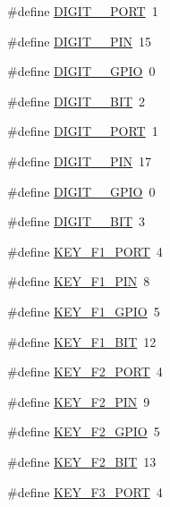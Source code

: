 \begin{DoxyCompactItemize}
\item 
\#define \hyperlink{group__hal_ga94523606bb277125408e8d824039941d}{D\+I\+G\+I\+T\+\_\+\_\+\+P\+O\+RT}~1
\item 
\#define \hyperlink{group__hal_gadd43f59c719841c9b909b1ac0d560306}{D\+I\+G\+I\+T\+\_\+\_\+\+P\+IN}~15
\item 
\#define \hyperlink{group__hal_gaaf8008c853f00449d861006e24ed25d3}{D\+I\+G\+I\+T\+\_\+\_\+\+G\+P\+IO}~0
\item 
\#define \hyperlink{group__hal_gaf2ebdb0e4e98558a4daa6f8f12e60508}{D\+I\+G\+I\+T\+\_\+\_\+\+B\+IT}~2
\item 
\#define \hyperlink{group__hal_gab7d700449bc667114f470a18eafc1df0}{D\+I\+G\+I\+T\+\_\+\_\+\+P\+O\+RT}~1
\item 
\#define \hyperlink{group__hal_ga73ea133d9e15b39a48d0b9ed29fb9aac}{D\+I\+G\+I\+T\+\_\+\_\+\+P\+IN}~17
\item 
\#define \hyperlink{group__hal_ga220245662e59f4aa122cbcf8e19ec0ba}{D\+I\+G\+I\+T\+\_\+\_\+\+G\+P\+IO}~0
\item 
\#define \hyperlink{group__hal_ga92ba98d9cb75844689edbad1e7fa38ed}{D\+I\+G\+I\+T\+\_\+\_\+\+B\+IT}~3
\item 
\#define \hyperlink{group__hal_ga72e1794db5f08d265794fd5895a0abda}{K\+E\+Y\+\_\+\+F1\+\_\+\+P\+O\+RT}~4
\item 
\#define \hyperlink{group__hal_gabd127e01a2241701fa51b22a5e1ac2d2}{K\+E\+Y\+\_\+\+F1\+\_\+\+P\+IN}~8
\item 
\#define \hyperlink{group__hal_ga5ca4d37214720b82e845407c6fa2347a}{K\+E\+Y\+\_\+\+F1\+\_\+\+G\+P\+IO}~5
\item 
\#define \hyperlink{group__hal_gaa5e208d84a752a40a307c23236dc60e2}{K\+E\+Y\+\_\+\+F1\+\_\+\+B\+IT}~12
\item 
\#define \hyperlink{group__hal_gaed0ee447835028acfe743784357d77e8}{K\+E\+Y\+\_\+\+F2\+\_\+\+P\+O\+RT}~4
\item 
\#define \hyperlink{group__hal_ga7016f3ff674089b3e9377b58fd5791a2}{K\+E\+Y\+\_\+\+F2\+\_\+\+P\+IN}~9
\item 
\#define \hyperlink{group__hal_ga84995a20a536edfbc062b220c761768e}{K\+E\+Y\+\_\+\+F2\+\_\+\+G\+P\+IO}~5
\item 
\#define \hyperlink{group__hal_gaa1529bc5c7a8cc9c0221078f2425eed8}{K\+E\+Y\+\_\+\+F2\+\_\+\+B\+IT}~13
\item 
\#define \hyperlink{group__hal_ga411346b5b630b61fd785409608439be4}{K\+E\+Y\+\_\+\+F3\+\_\+\+P\+O\+RT}~4
\item 

\end{DoxyCompactItemize}
